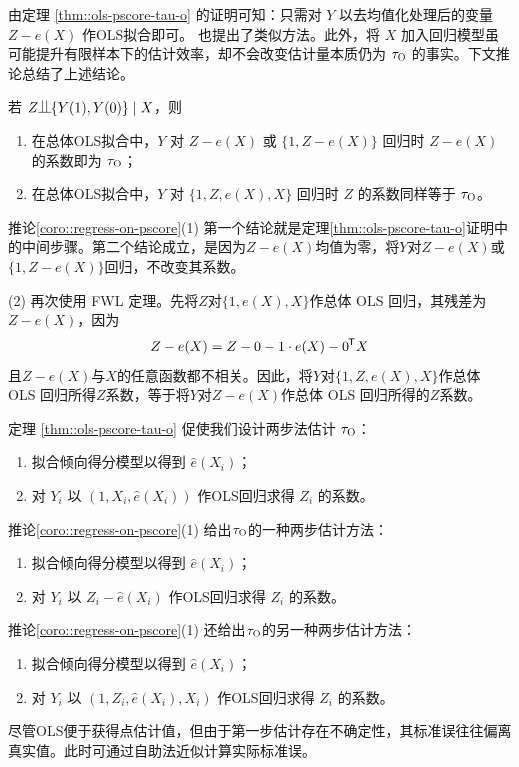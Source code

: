  
 由定理 \ref{thm::ols-pscore-tau-o} 的证明可知：只需对 $Y$ 以去均值化处理后的变量 $ Z-e(X)$ 作OLS拟合即可。\citet{lee2018simple} 也提出了类似方法。此外，将 $X$ 加入回归模型虽可能提升有限样本下的估计效率，却不会改变估计量本质仍为 $\tau_\textsc{O}$ 的事实。下文推论总结了上述结论。
 
 \begin{corollary}\label{coro::regress-on-pscore}
若 $Z\ind \{  Y(1), Y(0) \} \mid X$，则 
 \begin{enumerate}
 \item[(1)]
 在总体OLS拟合中，$Y$ 对 $Z-e(X)$ 或 $\{1, Z-e(X) \}$ 回归时 $Z-e(X)$ 的系数即为 $\tau_\textsc{O}$；
 \item[(2)]
 在总体OLS拟合中，$Y$ 对 $\{1, Z, e(X), X\}$ 回归时 $Z$ 的系数同样等于 $\tau_\textsc{O}$。 
 \end{enumerate}
 \end{corollary}
 
 
 
\begin{myproof}{推论}{\ref{coro::regress-on-pscore}}(1) 第一个结论就是定理\ref{thm::ols-pscore-tau-o}证明中的中间步骤。第二个结论成立，是因为$Z-e(X) $均值为零，将$Y$对$Z-e(X)$或$\{1, Z-e(X) \}$回归，不改变其系数。 


(2) 再次使用 FWL 定理。先将$Z$对$\{1, e(X), X\}$作总体 OLS 回归，其残差为$Z-e(X) $，因为
$$
Z-e(X) = Z-0 - 1\cdot e(X) - 0^{\mkern-1.5mu\mathsf{T}} X $$
且$Z-e(X)$与$X$的任意函数都不相关。因此，将$Y$对$\{1, Z, e(X), X\}$作总体 OLS 回归所得$Z$系数，等于将$Y$对$Z-e(X)$作总体 OLS 回归所得的$Z$系数。 
  \end{myproof}
  
  
  
  定理 \ref{thm::ols-pscore-tau-o} 促使我们设计两步法估计 $\tau_\textsc{O} $：
\begin{enumerate}
\item
拟合倾向得分模型以得到 $\hat e(X_i) $；
\item
对 $Y_i$ 以 $(1,X_i, \hat e(X_i) )$ 作OLS回归求得 $Z_i$ 的系数。 
\end{enumerate}  
推论\ref{coro::regress-on-pscore}(1) 给出$\tau_\textsc{O} $的一种两步估计方法： 
\begin{enumerate}
\item
拟合倾向得分模型以得到 $\hat e(X_i) $；
\item
对 $Y_i$ 以 $Z_i - \hat e(X_i)$ 作OLS回归求得 $Z_i$ 的系数。   
\end{enumerate}
推论\ref{coro::regress-on-pscore}(1) 还给出$\tau_\textsc{O} $的另一种两步估计方法： 
\begin{enumerate}
\item
拟合倾向得分模型以得到 $\hat e(X_i) $；
\item
对 $Y_i$ 以 $(1, Z_i , \hat e(X_i),  X_i ) $ 作OLS回归求得 $Z_i$ 的系数。   
\end{enumerate}
尽管OLS便于获得点估计值，但由于第一步估计存在不确定性，其标准误往往偏离真实值。此时可通过自助法近似计算实际标准误。 
  

